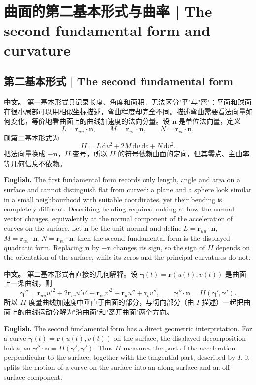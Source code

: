 \documentclass[UTF8,11pt,a4paper]{ctexart}
\newcommand{\APS}[2]{\par\noindent\textbf{中文。} #1\par\noindent\textbf{English.} #2\par\smallskip}
\newcommand{\dd}{\mathrm{d}}
\newcommand{\br}{\mathbf{r}}
\newcommand{\bn}{\mathbf{n}}
\newcommand{\bgamma}{\boldsymbol{\gamma}}
\begin{document}
\section[第二基本形式]{曲面的第二基本形式与曲率 | The second fundamental form and curvature}
\subsection{第二基本形式 | The second fundamental form}
\APS{第一基本形式只记录长度、角度和面积，无法区分"平"与"弯"：平面和球面在很小局部可以用相似坐标描述，弯曲程度却完全不同。描述弯曲需要看法向量如何变化，等价地看曲面上的曲线加速度的法向分量。设 $\bn$ 是单位法向量，定义
\[
L=\br_{uu}\cdot\bn,\qquad M=\br_{uv}\cdot\bn,\qquad N=\br_{vv}\cdot\bn,
\]
则第二基本形式为
\[
II=L\,\dd u^2+2M\,\dd u\,\dd v+N\,\dd v^2 .
\]
把法向量换成 $-\bn$，$II$ 变号，所以 $II$ 的符号依赖曲面的定向，但其零点、主曲率等几何信息不依赖。}{The first fundamental form records only length, angle and area on a surface and cannot distinguish flat from curved: a plane and a sphere look similar in a small neighbourhood with suitable coordinates, yet their bending is completely different. Describing bending requires looking at how the normal vector changes, equivalently at the normal component of the acceleration of curves on the surface. Let $\bn$ be the unit normal and define $L=\br_{uu}\cdot\bn$, $M=\br_{uv}\cdot\bn$, $N=\br_{vv}\cdot\bn$; then the second fundamental form is the displayed quadratic form. Replacing $\bn$ by $-\bn$ changes its sign, so the sign of $II$ depends on the orientation of the surface, while its zeros and the principal curvatures do not.}
\APS{第二基本形式有直接的几何解释。设 $\bgamma(t)=\br(u(t),v(t))$ 是曲面上一条曲线，则
\[
\bgamma''=\br_{uu}u'^2+2\br_{uv}u'v'+\br_{vv}v'^2+\br_u u''+\br_v v'',
\qquad
\bgamma''\cdot\bn=II(\bgamma',\bgamma').
\]
所以 $II$ 度量曲线加速度中垂直于曲面的部分，与切向部分（由 $I$ 描述）一起把曲面上的曲线运动分解为"沿曲面"和"离开曲面"两个方向。}{The second fundamental form has a direct geometric interpretation. For a curve $\bgamma(t)=\br(u(t),v(t))$ on the surface, the displayed decomposition holds, so $\bgamma''\cdot\bn=II(\bgamma',\bgamma')$. Thus $II$ measures the part of the acceleration perpendicular to the surface; together with the tangential part, described by $I$, it splits the motion of a curve on the surface into an along-surface and an off-surface component.}
\end{document}

